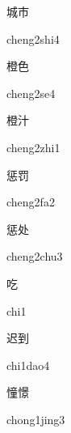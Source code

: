 \begin{multicols*}{2}
\begin{verbete}{城市}
\begin{pronuncia}{cheng2shi4}
\end{pronuncia}
\end{verbete}

\begin{verbete}[cheng2se4]{橙色}
\begin{pronuncia}{cheng2se4}
\end{pronuncia}
\end{verbete}

\begin{verbete}{橙汁}
\begin{pronuncia}{cheng2zhi1}
\end{pronuncia}
\end{verbete}

\begin{verbete}[cheng2fa2]{惩罚}
\begin{pronuncia}{cheng2fa2}
\end{pronuncia}
\end{verbete}

\begin{verbete}{惩处}
\begin{pronuncia}{cheng2chu3}
\end{pronuncia}
\end{verbete}

\begin{verbete}[chi1]{吃}
\begin{pronuncia}{chi1}
\end{pronuncia}
\end{verbete}

\begin{verbete}{迟到}
\begin{pronuncia}{chi1dao4}
\end{pronuncia}
\end{verbete}

\begin{verbete}{憧憬}
\begin{pronuncia}{chong1jing3}
\end{pronuncia}
\end{verbete}


\end{multicols*}
